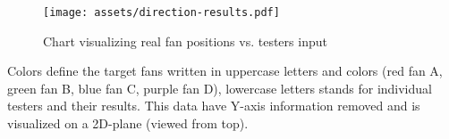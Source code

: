 \begin{figure}[H]{}
\centering\texttt{[image: assets/direction-results.pdf]}
\caption{Chart visualizing real fan positions vs. testers input}
\end{figure}

Colors define the target fans written in uppercase letters and colors
(red fan A, green fan B, blue fan C, purple fan D),
lowercase letters stands for individual testers and their results. This data
have Y-axis information removed and is visualized on a 2D-plane
(viewed from top).